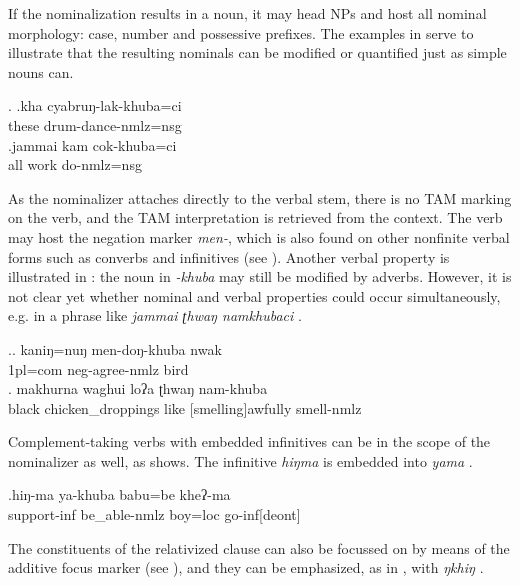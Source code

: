	
If the nominalization results in a noun, it may head NPs and host all nominal morphology: case, number and possessive prefixes. The examples in \Next serve to illustrate that the resulting nominals can be modified or quantified just as simple nouns can. 

\ex. \ag.kha cyabruŋ-lak-khuba=ci\\
	these drum-dance{\sc -nmlz=nsg}	\\
	 
 	\bg.jammai kam cok-khuba=ci\\
	all work do{\sc -nmlz=nsg}\\
	 	

	
As the nominalizer attaches directly to the verbal stem, there is no TAM marking on the verb, and the TAM interpretation is retrieved from the context. The verb may host the negation marker \emph{men-}, which is also found on other nonfinite verbal forms such as converbs and infinitives (see \Next[a]). Another verbal property is illustrated in \Next: the noun in \emph{-khuba} may still be modified by adverbs. However, it is not clear yet whether nominal and verbal properties could occur simultaneously, e.g. in a phrase like \emph{jammai ʈhwaŋ namkhubaci} .
	
\ex.\ag. kaniŋ=nuŋ   men-doŋ-khuba     nwak\\
	{\sc 1pl=com} {\sc neg}-agree-{\sc nmlz} bird		\\ 
	 
\bg. makhurna waghui loʔa ʈhwaŋ nam-khuba\\
black chicken\_droppings like {[smelling]}awfully smell-{\sc nmlz}\\


Complement-taking verbs with embedded infinitives can be in the scope of the nominalizer as well, as \Next shows. The infinitive \emph{hiŋma}  is embedded into \emph{yama} .
	
	\exg.hiŋ-ma   ya-khuba babu=be    kheʔ-ma\\
	support{\sc -inf} be\_able{\sc -nmlz} boy{\sc =loc} go{\sc -inf[deont]}\\
	

The constituents of the relativized clause can also be focussed on by means of the additive focus marker (see \Next[a]), and  they can be emphasized, as in \Next[b], with \emph{ŋkhiŋ} .

